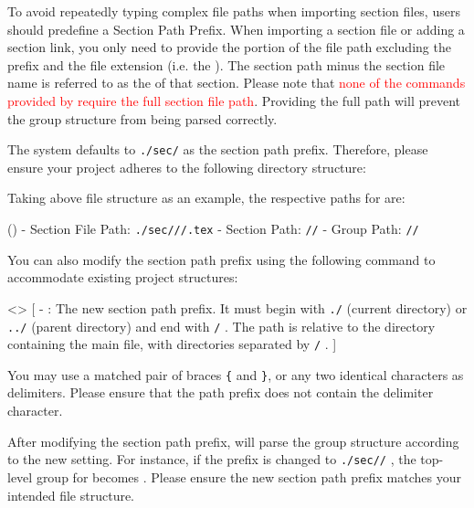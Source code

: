 
To avoid repeatedly typing complex file paths when importing section files, users should predefine a Section Path Prefix. When importing a section file or adding a section link, you only need to provide the portion of the file path excluding the prefix and the file extension (i.e. the ). The section path minus the section file name is referred to as the  of that section. Please note that \textcolor{red}{none of the commands provided by \SimpleSystemTeX require the full section file path}. Providing the full path will prevent the group structure from being parsed correctly.

The system defaults to \texttt{./sec/} as the section path prefix. Therefore, please ensure your project adheres to the following directory structure:

\medskip{}\medskip

Taking above file structure as an example, the respective paths for  are:

(){
    - Section File Path: \texttt{./sec///.tex}
    - Section Path: \texttt{//}
    - Group Path: \texttt{//}
}

You can also modify the section path prefix using the following command to accommodate existing project structures:

<>{
}[
    -  : The new section path prefix. It must begin with \texttt{./} (current directory) or \texttt{../} (parent directory) and end with \texttt{/} . The path is relative to the directory containing the main file, with directories separated by \texttt{/} .
]

You may use a matched pair of braces \texttt{\{} and \texttt{\}}, or any two identical characters as delimiters. Please ensure that the path prefix does not contain the delimiter character.

After modifying the section path prefix, \SimpleSystemTeX will parse the group structure according to the new setting. For instance, if the prefix is changed to \texttt{./sec//} , the top-level group for  becomes  . Please ensure the new section path prefix matches your intended file structure.

